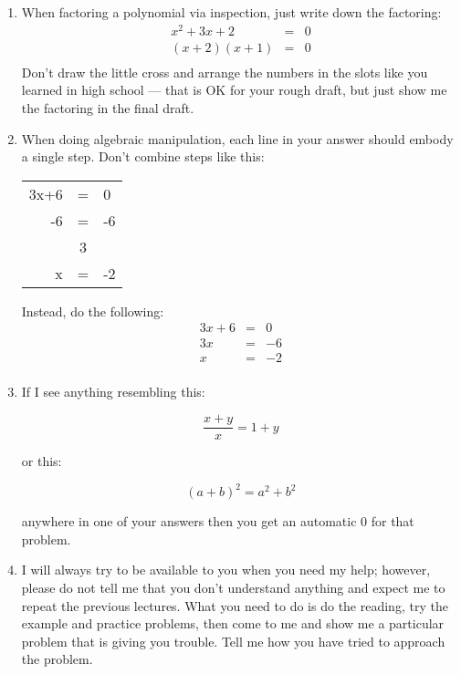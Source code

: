 \documentclass[letterpaper,12pt,fleqn]{article}
\begin{document}
\begin{enumerate}
\item When factoring a polynomial via inspection, just write down the factoring:
\begin{eqnarray*}
x^2+3x+2 &=& 0 \\
(x+2)(x+1) &=& 0 \\
\end{eqnarray*}
Don't draw the little cross and arrange the numbers in the slots like you
learned in high school --- that is OK for your rough draft, but just show me
the factoring in the final draft.

\newpage

\item When doing algebraic manipulation, each line in your answer should
    embody a single step. Don't combine steps like this:

\begin{tabular}{rcl}
3x+6 & = & 0 \\
-6 & = & -6 \\
\hline
 & 3 & \\
x & = & -2 \\
\end{tabular}

Instead, do the following:
\begin{eqnarray*}
3x+6 &=& 0 \\
3x &=& -6 \\
x &=& -2 \\
\end{eqnarray*}

\item If I see anything resembling this:

\[\frac{x+y}{x} = 1+y\]

or this:

\[(a+b)^2=a^2+b^2\]

anywhere in one of your answers then you get an automatic 0 for that problem.

\item I will always try to be available to you when you need my help; however,
    please do not tell me that you don't understand anything and expect me to
    repeat the previous lectures. What you need to do is do the reading, try
    the example and practice problems, then come to me and show me a particular
    problem that is giving you trouble. Tell me how you have tried to approach
    the problem.

\end{enumerate}
\end{document}

